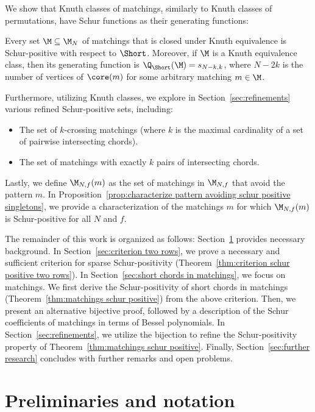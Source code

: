 We show that Knuth classes of matchings, similarly to Knuth classes of permutations, have Schur functions as their generating functions:

\begin{theorem}
    Every set $\M \subseteq \M_N$ of matchings that is closed under Knuth equivalence is Schur-positive with respect to $\Short$. Moreover, if $\M$ is a Knuth equivalence class, then its generating function is $\Q_{\Short}(\M) = s_{N-k,k}$, where $N-2k$ is the number of vertices of $\core(m)$ for some arbitrary matching $m \in \M$.
\end{theorem}

Furthermore, utilizing Knuth classes, we explore in Section~\ref{sec:refinements} various refined Schur-positive sets, including:
\begin{itemize}
    \item The set of $k$-crossing matchings (\ie where $k$ is the maximal cardinality of a set of pairwise intersecting chords).
    \item The set of matchings with exactly $k$ pairs of intersecting chords.
\end{itemize}

Lastly, we define $\M_{N,f}(m)$ as the set of matchings in $\M_{N,f}$ that avoid the pattern $m$. In Proposition~\ref{prop:characterize pattern avoiding schur positive singletons}, we provide a characterization of the matchings $m$ for which $\M_{N,f}(m)$ is Schur-positive for all $N$ and $f$.

The remainder of this work is organized as follows: Section~\ref{sec:preliminaries} provides necessary background. In Section~\ref{sec:criterion two rows}, we prove a necessary and sufficient criterion for sparse Schur-positivity (Theorem~\ref{thm:criterion schur positive two rows}). In Section~\ref{sec:short chords in matchings}, we focus on matchings. We first derive the Schur-positivity of short chords in matchings (Theorem~\ref{thm:matchings schur positive}) from the above criterion. Then, we present an alternative bijective proof, followed by a description of the Schur coefficients of matchings in terms of Bessel polynomials. In Section~\ref{sec:refinements}, we utilize the bijection to refine the Schur-positivity property of Theorem~\ref{thm:matchings schur positive}. Finally, Section~\ref{sec:further research} concludes with further remarks and open problems.

\section{Preliminaries and notation}
\label{sec:preliminaries}

